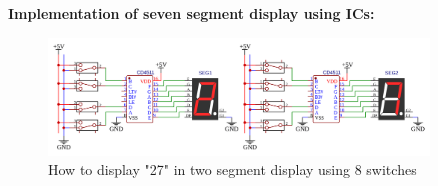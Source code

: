 \documentclass[pdftex,12pt,a4paper]{article}
\begin{document}
\begin{itemize}
\begin{itemize}
   \textbf{Implementation of seven segment display using ICs:}
   \begin{figure}[H]
    \centering
        \includegraphics[width=0.9\textwidth]{part5.png}	
        \caption{How to display "27" in two segment display using 8 switches}
        
   \end{figure}
    \end{itemize}
    
\end{itemize}
\end{document}
